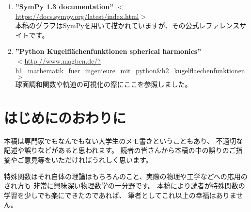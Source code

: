 \documentclass[../main/main]{subfiles}
\begin{document}
\begin{enumerate}
  \item \textbf{''SymPy 1.3 documentation''} $<$\url{https://docs.sympy.org/latest/index.html}$>$\\
  本稿のグラフはSymPyを用いて描かれていますが、その公式レファレンスサイトです。\vspace{6pt}

  \item \textbf{''Python Kugelfl\"{a}chenfunktionen spherical harmonics''}\\ 
$<$\url{http://www.magben.de/?h1=mathematik_fuer_ingenieure_mit_python&h2=kugelflaechenfunktionen}$>$\\
  球面調和関数や軌道の可視化の際にここを参照しました。

\end{enumerate}

\section*{はじめにのおわりに}

本稿は専門家でもなんでもない大学生のメモ書きということもあり、
不適切な記述や誤りなどがあると思われます。
読者の皆さんから本稿の中の誤りのご指摘やご意見等をいただければうれしく思います。

特殊関数はそれ自体の理論はもちろんのこと、実際の物理や工学などへの応用のされ方も
非常に興味深い物理数学の一分野です。
本稿により読者が特殊関数の学習を少しでも楽にできたのであれば、
筆者としてこれ以上の幸福はありません。
\end{document}
